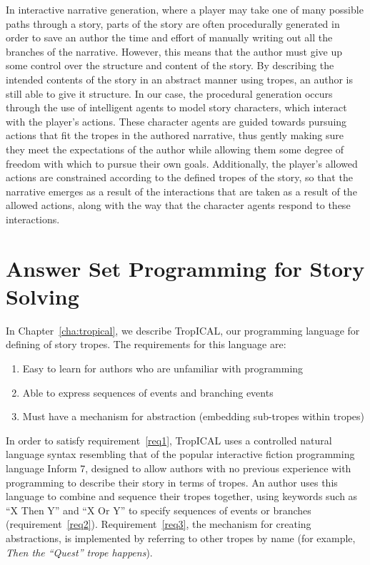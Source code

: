 \documentclass[11pt]{report}
\begin{document}
In interactive narrative generation, where a player may take one of many
possible paths through a story, parts of the story are often procedurally
generated in order to save an author the time and effort of manually writing out
all the branches of the narrative. However, this means that the author must give
up some control over the structure and content of the story. By describing the
intended contents of the story in an abstract manner using tropes, an author is
still able to give it structure. In our case, the procedural generation occurs
through the use of intelligent agents to model story characters, which interact
with the player's actions. These character
agents are guided towards pursuing actions that fit the tropes in the authored
narrative, thus gently making sure they meet the expectations of the author
while allowing them some degree of freedom with which to pursue their own goals.
Additionally, the player's allowed actions are constrained according to the
defined tropes of the story, so that the narrative emerges as a result of the
interactions that are taken as a result of the allowed actions, along with the
way that the character agents respond to these interactions.

\section{Answer Set Programming for Story Solving}
\label{sec:trope-interface}
In Chapter~\ref{cha:tropical}, we describe TropICAL, our programming language
for defining of story tropes. The requirements for this language are:

\begin{enumerate}
\item Easy to learn for authors who are unfamiliar with programming\label{req1}
  \item Able to express sequences of events and branching events\label{req2}
  \item Must have a mechanism for abstraction (embedding sub-tropes within tropes)\label{req3}
\end{enumerate}

In order to satisfy requirement~\ref{req1}, TropICAL uses a controlled
natural language syntax resembling that of the popular interactive fiction
programming language Inform 7, designed to allow authors with no previous
experience with programming to describe their story in terms of tropes. An
author uses this language to combine and sequence their tropes together, using
keywords such as ``X Then Y'' and ``X Or Y'' to specify sequences of events or
branches (requirement~\ref{req2}). Requirement~\ref{req3}, the mechanism for
creating abstractions, is implemented by referring to other tropes by name (for
example, \emph{Then the ``Quest'' trope happens}).
\end{document}
